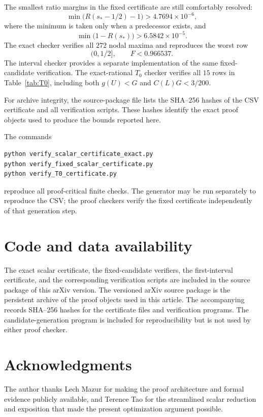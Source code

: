 \documentclass[11pt]{amsart}
\theoremstyle{definition}
\begin{document}
The smallest ratio margins in the fixed certificate are still comfortably resolved:
\[
 \min\bigl(R(s_\ast-1/2)-1\bigr)
 >4.7694\times10^{-6},
\]
where the minimum is taken only when a predecessor exists, and
\[
 \min\bigl(1-R(s_\ast)\bigr)
 >6.5842\times10^{-5}.
\]
The exact checker verifies all $272$ nodal maxima and reproduces the worst row
\[
 (0,1/2],\qquad F<0.966537.
\]
The interval checker provides a separate implementation of the same fixed-candidate verification.  The exact-rational $T_0$ checker verifies all $15$ rows in Table~\ref{tab:T0}, including both $g(U)<G$ and $C(L)G<3/200$.

For archive integrity, the source-package file  lists the SHA--256 hashes of the CSV certificate and all verification scripts.  These hashes identify the exact proof objects used to produce the bounds reported here.

The commands
\begin{verbatim}
python verify_scalar_certificate_exact.py
python verify_fixed_scalar_certificate.py
python verify_T0_certificate.py
\end{verbatim}
reproduce all proof-critical finite checks.  The generator may be run separately to reproduce the CSV; the proof checkers verify the fixed certificate independently of that generation step.

\section*{Code and data availability}
The exact scalar certificate, the fixed-candidate verifiers, the first-interval certificate, and the corresponding verification scripts are included in the source package of this arXiv version.  The versioned arXiv source package is the persistent archive of the proof objects used in this article.  The accompanying  records SHA--256 hashes for the certificate files and verification programs.  The candidate-generation program is included for reproducibility but is not used by either proof checker.

\section*{Acknowledgments}
The author thanks Lech Mazur for making the proof architecture and formal evidence publicly available, and Terence Tao for the streamlined scalar reduction and exposition that made the present optimization argument possible.
\end{document}
